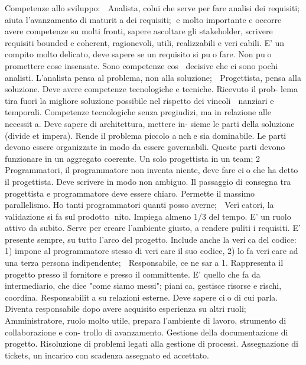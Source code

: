 \documentclass[10pt]{article}
\begin{document}
\begin{itemize}
\begin{itemize}
Competenze allo sviluppo:
 Analista, colui che serve per fare analisi dei requisiti; aiuta l'avanzamento 
di maturita dei requisiti; e
molto importante e occorre avere competenze su molti fronti, sapere ascoltare 
gli stakeholder, scrivere
requisiti bounded e coherent, ragionevoli, utili, realizzabili e vericabili. 
E' un compito molto delicato,
deve sapere se un requisito si puo fare. Non puo promettere cose insensate. 
Sono competenze cos
decisive che ci sono pochi analisti. L'analista pensa al problema, non alla 
soluzione;
 Progettista, pensa alla soluzione. Deve avere competenze tecnologiche e 
tecniche. Ricevuto il prob-
lema tira fuori la migliore soluzione possibile nel rispetto dei vincoli 
nanziari e temporali. Competenze
tecnologiche senza pregiudizi, ma in relazione alle necessita. Deve sapere di 
architettura, mettere in-
sieme le parti della soluzione (divide et impera). Rende il problema piccolo 
anche sia dominabile. Le
parti devono essere organizzate in modo da essere governabili. Queste parti 
devono funzionare in un
aggregato coerente. Un solo progettista in un team;
2
 Programmatori, il programmatore non inventa niente, deve fare cio che ha 
detto il progettista. Deve
scrivere in modo non ambiguo. Il passaggio di consegna tra progettista e 
programmatore deve essere
chiaro. Permette il massimo parallelismo. Ho tanti programmatori quanti posso 
averne;
 Vericatori, la validazione si fa sul prodotto nito. Impiega almeno 1/3 del 
tempo. E' un ruolo
attivo da subito. Serve per creare l'ambiente giusto, a rendere puliti i 
requisiti. E' presente sempre, su
tutto l'arco del progetto. Include anche la verica del codice: 1) impone al 
programmatore stesso di
vericare il suo codice, 2) lo fa vericare ad una terza persona indipendente;
 Responsabile, ce ne sara 1. Rappresenta il progetto presso il fornitore e 
presso il committente.
E' quello che fa da intermediario, che dice "come siamo messi"; pianica, 
gestisce risorse e rischi,
coordina. Responsabilita su relazioni esterne. Deve sapere cio di cui parla. 
Diventa responsabile dopo
avere acquisito esperienza su altri ruoli;
 Amministratore, ruolo molto utile, prepara l'ambiente di lavoro, strumento di 
collaborazione e con-
trollo di avanzamento. Gestione della documentazione di progetto. Risoluzione 
di problemi legati alla
gestione di processi. Assegnazione di tickets, un incarico con scadenza 
assegnato ed accettato.
\end{itemize}

\end{itemize}
\end{document}
